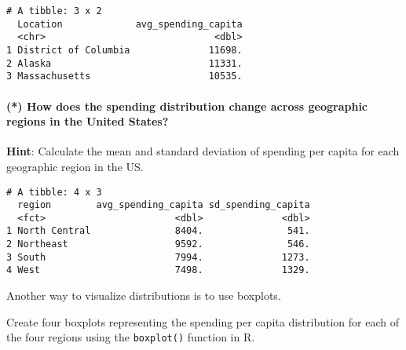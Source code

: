 \documentclass[]{article}
\newenvironment{Shaded}{\begin{snugshade}}{\end{snugshade}}
\newcommand{\DataTypeTok}[1]{\textcolor[rgb]{0.13,0.29,0.53}{#1}}
\newcommand{\KeywordTok}[1]{\textcolor[rgb]{0.13,0.29,0.53}{\textbf{#1}}}
\newcommand{\NormalTok}[1]{#1}
\newcommand{\OperatorTok}[1]{\textcolor[rgb]{0.81,0.36,0.00}{\textbf{#1}}}
\newcommand{\StringTok}[1]{\textcolor[rgb]{0.31,0.60,0.02}{#1}}
\let\oldparagraph\paragraph
\renewcommand{\paragraph}[1]{\oldparagraph{#1}\mbox{}}
\begin{document}
\begin{verbatim}
# A tibble: 3 x 2
  Location             avg_spending_capita
  <chr>                              <dbl>
1 District of Columbia              11698.
2 Alaska                            11331.
3 Massachusetts                     10535.
\end{verbatim}

\hypertarget{how-does-the-spending-distribution-change-across-geographic-regions-in-the-united-states}{%
\paragraph{(*) How does the spending distribution change across
geographic regions in the United
States?}\label{how-does-the-spending-distribution-change-across-geographic-regions-in-the-united-states}}

\textbf{Hint}: Calculate the mean and standard deviation of spending per
capita for each geographic region in the US.

\begin{Shaded}
\end{Shaded}

\begin{verbatim}
# A tibble: 4 x 3
  region        avg_spending_capita sd_spending_capita
  <fct>                       <dbl>              <dbl>
1 North Central               8404.               541.
2 Northeast                   9592.               546.
3 South                       7994.              1273.
4 West                        7498.              1329.
\end{verbatim}

Another way to visualize distributions is to use boxplots.

Create four boxplots representing the spending per capita distribution
for each of the four regions using the \texttt{boxplot()} function in R.

\begin{Shaded}
\end{Shaded}
\end{document}
